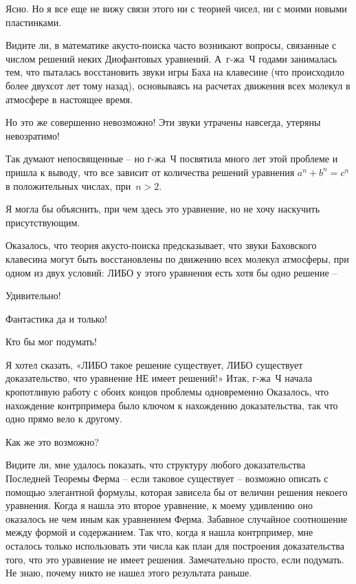 \documentclass[../main.tex]{subfiles}
\begin{document}
\begin{dialogue}
 Ясно. Но я все еще не вижу связи этого ни с теорией чисел, ни с моими новыми пластинками.

 Видите ли, в математике акусто-поиска часто возникают вопросы, связанные с числом решений неких Диофантовых уравнений. А~г-жа~Ч годами занималась тем, что пыталась восстановить звуки игры Баха на клавесине (что происходило более двухсот лет тому назад), основываясь на расчетах движения всех молекул в атмосфере в настоящее время.

 Но это же совершенно невозможно! Эти звуки утрачены навсегда, утеряны невозратимо!

 Так думают непосвященные \--- но г-жа~Ч посвятила много лет этой проблеме и пришла к выводу, что все зависит от количества решений уравнения $a^n + b^n = c^n$ в положительных числах, при~$n > 2$.

 Я могла бы объяснить, при чем здесь это уравнение, но не хочу наскучить присутствующим.

 Оказалось, что теория акусто-поиска предсказывает, что звуки Баховского клавесина могут быть восстановлены по движению всех молекул атмосферы, при одном из двух условий: ЛИБО у этого уравнения есть хотя бы одно решение \---

 Удивительно!

 Фантастика да и только!

 Кто бы мог подумать!

 Я хотел сказать, «ЛИБО такое решение существует, ЛИБО существует доказательство, что уравнение НЕ имеет решений!» Итак, г-жа~Ч начала кропотливую работу с обоих концов проблемы одновременно Оказалось, что нахождение контрпримера было ключом к нахождению доказательства, так что одно прямо вело к другому.

 Как же это возможно?

 Видите ли, мне удалось показать, что структуру любого доказательства Последней Теоремы Ферма \--- если таковое существует \--- возможно описать с помощью элегантной формулы, которая зависела бы от величин решения некоего уравнения. Когда я нашла это второе уравнение, к моему удивлению оно оказалось не чем иным как уравнением Ферма. Забавное случайное соотношение между формой и содержанием. Так что, когда я нашла контрпример, мне осталось только использовать эти числа как план для построения доказательства того, что это уравнение не имеет решения. Замечательно просто, если подумать. Не знаю, почему никто не нашел этого результата раньше.


\end{dialogue}
\end{document}
